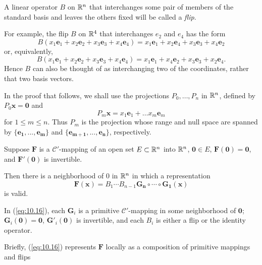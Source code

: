 \begin{mydef}
    \label{def:10.6}
    A linear operator $B$ on ${\protect\mathbb R}^n$ that interchanges some pair of members of the standard basis and leaves the others fixed will be called a \emph{flip}.

    For example, the flip $B$ on ${\protect\mathbb R}^4$ that interchanges $e_2$ and $e_4$ has the form
    \begin{equation}
        \label{eq:10.13}
        B(x_1 \mathbf{e}_1 + 
        x_2 \mathbf{e}_2 + 
        x_3 \mathbf{e}_3 + 
        x_4 \mathbf{e}_4) = 
        x_1 \mathbf{e}_1 + 
        x_2 \mathbf{e}_4 + 
        x_3 \mathbf{e}_3 + 
        x_4 \mathbf{e}_2
    \end{equation}
    or, equivalently,
    \begin{equation}
        \label{eq:10.14}
        B(x_1 \mathbf{e}_1 + 
        x_2 \mathbf{e}_2 + 
        x_3 \mathbf{e}_3 + 
        x_4 \mathbf{e}_4) = 
        x_1 \mathbf{e}_1 + 
        x_4 \mathbf{e}_2 +
        x_3 \mathbf{e}_3 + 
        x_2 \mathbf{e}_4 .
    \end{equation}
    Hence $B$ can also be thought of as interchanging two of the coordinates,
    rather that two basis vectors.

    In the proof that follows, we shall use the projections $P_0,\dots,P_n$ in ${\protect\mathbb R}^n$, defined by $P_0 \mathbf{x = 0}$ and 
    \begin{equation}
        \label{eq:10.15}
        P_m \mathbf{x} = 
        x_1 \mathbf{e}_1 + \dots 
        x_m \mathbf{e}_m 
    \end{equation}
    for $1 \leq m \leq n$.
    Thus $P_m$ is the projection whose range and null space are spanned by $\{\mathbf{e_1,...,e_m}\}$ and $\{\mathbf{e_{m+1},...,e_n}\}$,
    respectively.
\end{mydef}

\begin{thm}
    \label{thm:10.7}
    Suppose $\mathbf{F}$ is a $\mathscr{C}'$-mapping of an open set $E \subset {\protect\mathbb R}^n$ into ${\protect\mathbb R}^n$, $\mathbf{0} \in E$, $\mathbf{F(0) = 0}$, and $\mathbf{F'(0)}$ is invertible.
    
    Then there is a neighborhood of $0$ in ${\protect\mathbb R}^n$ in which a representation
    \begin{equation}
        \label{eq:10.16}
        \mathbf{F(x)} = B_1 \cdots B_{n-1} \mathbf{G_n \circ \cdots \circ G_1(x)}
    \end{equation}
    is valid.

    In (\ref{eq:10.16}), each $\mathbf{G}_i$ is a primitive $\mathscr{C}'$-mapping in some neighborhood of $\mathbf{0}$;
    $\mathbf{G}_i(\mathbf{0})=\mathbf{0}$, $\mathbf{G}'_i(\mathbf{0})$ is invertible, and each $B_i$ is either a flip or the identity operator.
\end{thm}

Briefly, (\ref{eq:10.16}) represents $\mathbf{F}$ locally as a composition of primitive mappings and flips



